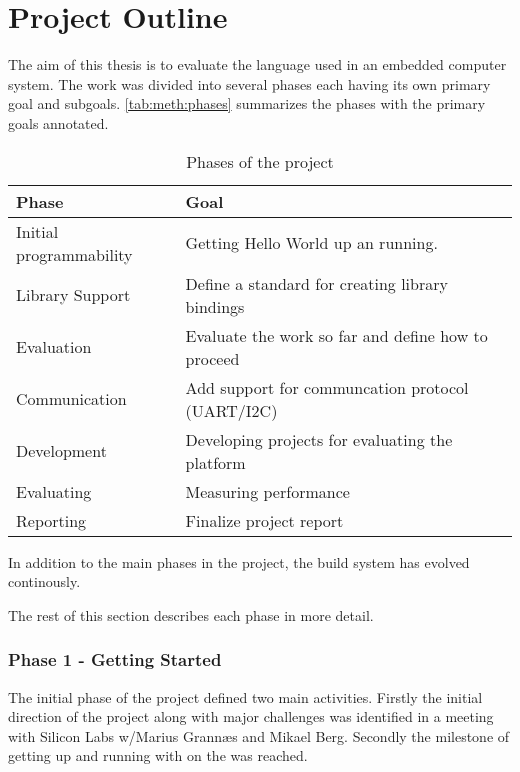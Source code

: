 \section{Project Outline}
\label{sec:project-outline}

The aim of this thesis is to evaluate the {\rust} language used in an embedded computer system.
The work was divided into several phases each having its own primary goal and subgoals.
\autoref{tab:meth:phases} summarizes the phases with the primary goals annotated.

\begin{table}[H]
  \begin{center}
    \begin{tabular}{|l|l|}
      \hline
      Phase&Goal \\
      \hline
      \hline
      Initial programmability&Getting Hello World up an running.\\
      \hline
      Library Support&Define a standard for creating library bindings\\
      \hline
      Evaluation&Evaluate the work so far and define how to proceed\\
      \hline
      Communication&Add support for communcation protocol (UART/I2C)\\
      \hline
      Development&Developing projects for evaluating the platform\\
      \hline
      Evaluating&Measuring performance\\
      \hline
      Reporting&Finalize project report\\
      \hline
    \end{tabular}
  \end{center}
  \caption{Phases of the project}
  \label{tab:meth:phases}
\end{table}

In addition to the main phases in the project, the build system has evolved continously.

The rest of this section describes each phase in more detail.

\subsubsection{Phase 1 - Getting Started}
The initial phase of the project defined two main activities.
Firstly the initial direction of the project along with major challenges was identified in a meeting with Silicon Labs w/Marius Grannæs and Mikael Berg.
Secondly the milestone of getting up and running with {\rust} on the {\gecko} was reached.

